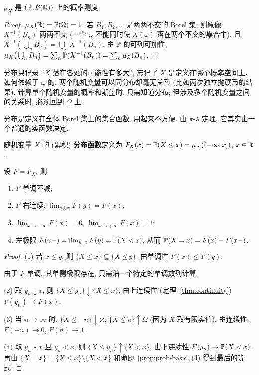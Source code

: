\begin{proposition}
$\mu_X$ 是 $(\R,\mathcal{B}(\R))$ 上的概率测度.
\end{proposition}

\begin{proof}
$\mu_X(\R)=\P(\Omega)=1$. 若 $B_1,B_2,\dots$ 是两两不交的 Borel 集, 则原像 $X^{-1}(B_n)$ 两两不交 (一个 $\omega$ 不能同时使 $X(\omega)$ 落在两个不交的集合中), 且 $X^{-1}(\bigcup_n B_n)=\bigcup_n X^{-1}(B_n)$. 由 $\P$ 的可列可加性,
$\mu_X\big(\bigcup_n B_n\big)=\sum_n\P(X^{-1}(B_n))=\sum_n\mu_X(B_n)$.
\end{proof}

\begin{intuition}
分布只记录 ``$X$ 落在各处的可能性有多大'', 忘记了 $X$ 是定义在哪个概率空间上、如何依赖于 $\omega$ 的. 两个随机变量可以同分布却毫无关系 (比如两次独立抛硬币的结果). 计算单个随机变量的概率和期望时, 只需知道分布; 但涉及多个随机变量之间的关系时, 必须回到 $\Omega$ 上.
\end{intuition}

分布是定义在全体 Borel 集上的集合函数, 用起来不方便. 由 $\pi$-$\lambda$ 定理, 它其实由一个普通的实函数决定.

\begin{definition}[分布函数]\label{def:cdf}
随机变量 $X$ 的 (累积) \textbf{分布函数}定义为 $F_X(x)=\P(X\le x)=\mu_X((-\infty,x])$, $x\in\R$.
\end{definition}

\begin{theorem}[分布函数的性质]\label{thm:cdf-properties}
设 $F=F_X$. 则
\begin{enumerate}
\item $F$ 单调不减;
\item $F$ 右连续: $\lim_{y\downarrow x}F(y)=F(x)$;
\item $\lim_{x\to-\infty}F(x)=0$, $\lim_{x\to+\infty}F(x)=1$;
\item 左极限 $F(x-)=\lim_{y\uparrow x}F(y)=\P(X<x)$, 从而 $\P(X=x)=F(x)-F(x-)$.
\end{enumerate}
\end{theorem}

\begin{proof}
(1) 若 $x\le y$, 则 $\{X\le x\}\subseteq\{X\le y\}$, 由单调性 $F(x)\le F(y)$.

由于 $F$ 单调, 其单侧极限存在, 只需沿一个特定的单调数列计算.

(2) 取 $y_n\downarrow x$, 则 $\{X\le y_n\}\downarrow\{X\le x\}$, 由上连续性 (定理~\ref{thm:continuity}) $F(y_n)\to F(x)$.

(3) 当 $n\to\infty$ 时, $\{X\le -n\}\downarrow\varnothing$, $\{X\le n\}\uparrow\Omega$ (因为 $X$ 取有限实值). 由连续性, $F(-n)\to0$, $F(n)\to1$.

(4) 取 $y_n\uparrow x$ 且 $y_n<x$, 则 $\{X\le y_n\}\uparrow\{X<x\}$, 由下连续性 $F(y_n)\to\P(X<x)$. 再由 $\{X=x\}=\{X\le x\}\setminus\{X<x\}$ 和命题~\ref{prop:prob-basic} (4) 得到最后的等式.
\end{proof}

